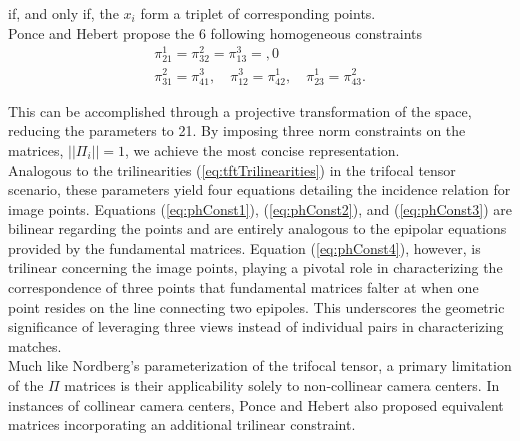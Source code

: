 if, and only if, the \( x_i \) form a triplet of corresponding points.\\
Ponce and Hebert propose the 6 following homogeneous constraints
\begin{equation}
	\begin{gathered}
		\pi_{21}^1 = \pi_{32}^2 = \pi_{13}^3 = ,0\\
		\pi_{31}^2 = \pi_{41}^3, \quad \pi_{12}^3 = \pi_{42}^1, \quad \pi_{23}^1 = \pi_{43}^2.
	\end{gathered}
\end{equation}

This can be accomplished through a projective transformation of the space, reducing the parameters to 21. By imposing three norm constraints on the matrices, \( || \Pi_i || = 1 \), we achieve the most concise representation.\\

Analogous to the trilinearities (\ref{eq:tftTrilinearities}) in the trifocal tensor scenario, these parameters yield four equations detailing the incidence relation for image points. Equations (\ref{eq:phConst1}), (\ref{eq:phConst2}), and (\ref{eq:phConst3}) are bilinear regarding the points and are entirely analogous to the epipolar equations provided by the fundamental matrices. Equation (\ref{eq:phConst4}), however, is trilinear concerning the image points, playing a pivotal role in characterizing the correspondence of three points that fundamental matrices falter at when one point resides on the line connecting two epipoles. This underscores the geometric significance of leveraging three views instead of individual pairs in characterizing matches.\\

Much like Nordberg's parameterization of the trifocal tensor, a primary limitation of the \( \Pi \) matrices is their applicability solely to non-collinear camera centers. In instances of collinear camera centers, Ponce and Hebert also proposed equivalent matrices incorporating an additional trilinear constraint.
